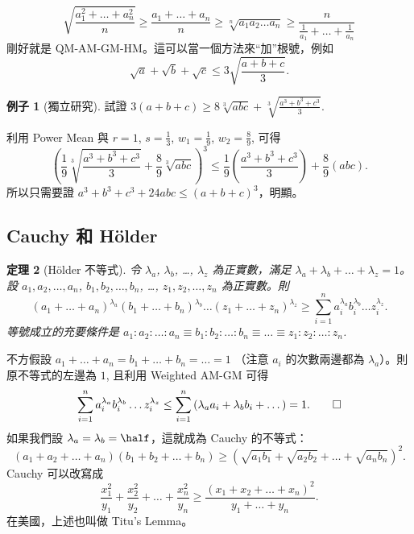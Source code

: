 \documentclass[11pt,nothm]{scrartcl}
\newtheorem{theorem}{\color{blue!40!black}定理}
\theoremstyle{definition}
\newtheorem{example}[theorem]{\color{blue!40!black}例子}
\let\oldendproof\endproof
\renewenvironment{proof}[1][【證】]{%
  \oldproof[\bfseries #1\nopunct]%
}{\oldendproof}
\begin{document}
\[ \sqrt{\frac{a_1^2+\dots+a_n^2}{n}}
  \ge \frac{a_1+\dots+a_n}{n}
  \ge \sqrt[n]{a_1a_2 \dots a_n}
  \ge \frac{n}{\frac{1}{a_1} + \dots + \frac{1}{a_n}} \]
剛好就是 QM-AM-GM-HM。這可以當一個方法來“加”根號，例如
\[ \sqrt a + \sqrt b + \sqrt c \le 3\sqrt{\frac{a+b+c}{3}}. \]

\begin{example}
  [獨立研究] 試證 $3(a+b+c) \ge 8\sqrt[3]{abc} + \sqrt[3]{\frac{a^3+b^3+c^3}{3}}$.
\end{example}
\begin{proof}
  利用 Power Mean 與 $r=1$, $s=\frac 13$, $w_1 = \frac 19$, $w_2 = \frac 89$, 可得
  \[ \left( \frac 19 \sqrt[3]{\frac{a^3+b^3+c^3}{3}} + \frac 89 \sqrt[3]{abc} \right)^3
  \le \frac19 \left( \frac{a^3+b^3+c^3}{3} \right) + \frac 89 \left( abc \right). \]
  所以只需要證 $a^3+b^3+c^3+24abc \le (a+b+c)^3$，明顯。
\end{proof}

\subsection{Cauchy 和 H\"older}
\begin{theorem}[H\"older 不等式]
  令 $\lambda_a$, $\lambda_b$, \dots, $\lambda_z$ 為正實數，滿足 $\lambda_a + \lambda_b + \dots + \lambda_z = 1$。 設 $a_1, a_2, \dots, a_n$, $b_1, b_2, \dots, b_n$, \dots, $z_1, z_2, \dots, z_n$ 為正實數。則
  \[ \left( a_1+\dots+a_n \right)^{\lambda_a}
    \left( b_1+\dots+b_n \right)^{\lambda_b}
    \dots
    \left( z_1+\dots+z_n \right)^{\lambda_z}
    \ge \sum_{i=1}^n a_i^{\lambda_a} b_i^{\lambda_b} \dots z_i^{\lambda_z}. \]
  等號成立的充要條件是 $a_1 : a_2 : \dots : a_n \equiv b_1 : b_2 : \dots : b_n \equiv \dots \equiv z_1 : z_2 : \dots : z_n$.
\end{theorem}
\begin{proof}
  不方假設 $a_1+\dots+a_n = b_1+\dots+b_n = \dots = 1$ （注意 $a_i$ 的次數兩邊都為 $\lambda_a$）。則原不等式的左邊為 $1$, 且利用 Weighted AM-GM 可得
  \[ \sum_{i=1}^n a_i^{\lambda_a} b_i^{\lambda_b} \dots z_i^{\lambda_z}
    \le \sum_{i=1}^n \left( \lambda_a a_i + \lambda_b b_i + \dots \right)
    = 1. \qedhere \]
\end{proof}
如果我們設 $\lambda_a = \lambda_b = \half$，這就成為 Cauchy 的不等式：
\[ \left( a_1+a_2+\dots+a_n \right)\left( b_1+b_2+\dots+b_n \right)
  \ge \left( \sqrt{a_1 b_1} + \sqrt{a_2 b_2} + \dots + \sqrt{a_n b_n} \right)^2. \]
Cauchy 可以改寫成
\[ \frac{x_1^2}{y_1} + \frac{x_2^2}{y_2} + \dots + \frac{x_n^2}{y_n} \ge \frac{\left( x_1+x_2+\dots+x_n \right)^2}{y_1+\dots+y_n}. \]
在美國，上述也叫做 Titu's Lemma。
\end{document}

